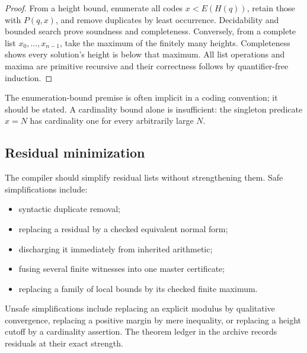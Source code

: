 \begin{proof}
From a height bound, enumerate all codes \(x<E(H(q))\), retain those with \(P(q,x)\), and remove duplicates by least occurrence.  Decidability and bounded search prove soundness and completeness.  Conversely, from a complete list \(x_0,\ldots,x_{n-1}\), take the maximum of the finitely many heights.  Completeness shows every solution's height is below that maximum.  All list operations and maxima are primitive recursive and their correctness follows by quantifier-free induction.
\end{proof}

The enumeration-bound premise is often implicit in a coding convention; it should be stated.  A cardinality bound alone is insufficient: the singleton predicate \(x=N\) has cardinality one for every arbitrarily large \(N\).

\subsection{Residual minimization}

The compiler should simplify residual lists without strengthening them.  Safe simplifications include:
\begin{itemize}[leftmargin=2em]
\item syntactic duplicate removal;
\item replacing a residual by a checked equivalent normal form;
\item discharging it immediately from inherited arithmetic;
\item fusing several finite witnesses into one master certificate;
\item replacing a family of local bounds by its checked finite maximum.
\end{itemize}
Unsafe simplifications include replacing an explicit modulus by qualitative convergence, replacing a positive margin by mere inequality, or replacing a height cutoff by a cardinality assertion.  The theorem ledger in the archive records residuals at their exact strength.
